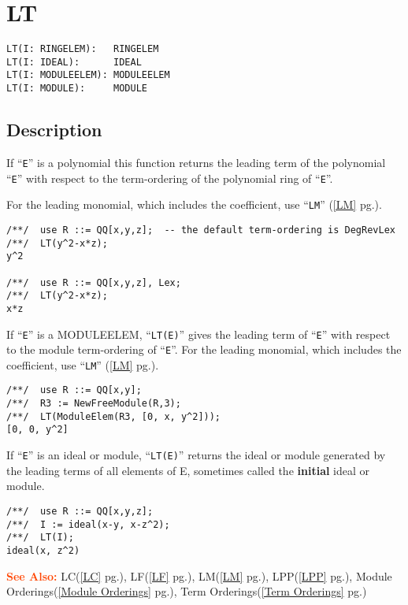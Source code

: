 \documentclass[a4paper]{mybook}
\newenvironment{command}{}{} %
\newcommand\SeeAlso{\par\textcolor{OrangeRed}{\textbf{\large See Also: }}}
\begin{document}
\section{LT}
\label{LT}
\begin{command} %


\begin{Verbatim}[label=syntax, rulecolor=\color{MidnightBlue},
frame=single]
LT(I: RINGELEM):   RINGELEM
LT(I: IDEAL):      IDEAL
LT(I: MODULEELEM): MODULEELEM
LT(I: MODULE):     MODULE
\end{Verbatim}


\subsection*{Description}

If ``\verb&E&'' is a polynomial this function returns the leading term of the
polynomial ``\verb&E&'' with respect to the term-ordering of the polynomial ring
of ``\verb&E&''.
\par 
For the leading monomial, which includes the coefficient, use ``\verb&LM&'' (\ref{LM} pg.\pageref{LM}).
\begin{Verbatim}[label=example, rulecolor=\color{PineGreen}, frame=single]
/**/  use R ::= QQ[x,y,z];  -- the default term-ordering is DegRevLex
/**/  LT(y^2-x*z);
y^2

/**/  use R ::= QQ[x,y,z], Lex;
/**/  LT(y^2-x*z);
x*z
\end{Verbatim}

If ``\verb&E&'' is a MODULEELEM, ``\verb&LT(E)&'' gives the leading term
of ``\verb&E&'' with respect to the module term-ordering of ``\verb&E&''.
For the leading monomial, which includes the coefficient, use ``\verb&LM&'' (\ref{LM} pg.\pageref{LM}).
\begin{Verbatim}[label=example, rulecolor=\color{PineGreen}, frame=single]
/**/  use R ::= QQ[x,y];
/**/  R3 := NewFreeModule(R,3);
/**/  LT(ModuleElem(R3, [0, x, y^2]));
[0, 0, y^2]
\end{Verbatim}

If ``\verb&E&'' is an ideal or module, ``\verb&LT(E)&'' returns the ideal or module
generated by the leading terms of all elements of E, sometimes called
the \textbf{initial} ideal or module.
\begin{Verbatim}[label=example, rulecolor=\color{PineGreen}, frame=single]
/**/  use R ::= QQ[x,y,z];
/**/  I := ideal(x-y, x-z^2);
/**/  LT(I);
ideal(x, z^2)
\end{Verbatim}


\SeeAlso %
  LC(\ref{LC} pg.\pageref{LC}), 
    LF(\ref{LF} pg.\pageref{LF}), 
    LM(\ref{LM} pg.\pageref{LM}), 
    LPP(\ref{LPP} pg.\pageref{LPP}), 
    Module Orderings(\ref{Module Orderings} pg.\pageref{Module Orderings}), 
    Term Orderings(\ref{Term Orderings} pg.\pageref{Term Orderings})
\end{command} %
\end{document}
